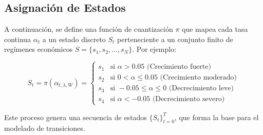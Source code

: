 \subsection{Asignación de Estados}
A continuación, se define una función de cuantización \(\pi\) que mapea cada tasa continua \(\alpha_t\) a un estado discreto \(S_t\) perteneciente a un conjunto finito de regímenes económicos \(S = \{s_1, s_2, \dots, s_N\}\). Por ejemplo:

\begin{equation}
S_t = \pi(\alpha_{t,\lambda,W}) = 
\begin{cases}
s_1 & \text{si } \alpha > 0.05 \text{ (Crecimiento fuerte)} \\
s_2 & \text{si } 0 < \alpha \leq 0.05 \text{ (Crecimiento moderado)} \\
s_3 & \text{si } -0.05 \leq \alpha \leq 0 \text{ (Decrecimiento leve)} \\
s_4 & \text{si } \alpha < -0.05 \text{ (Decrecimiento severo)}
\end{cases}
\label{eq:state_assignment_pi}
\end{equation}

Este proceso genera una secuencia de estados \(\{S_t\}_{t=0}^T\), que forma la base para el modelado de transiciones.


